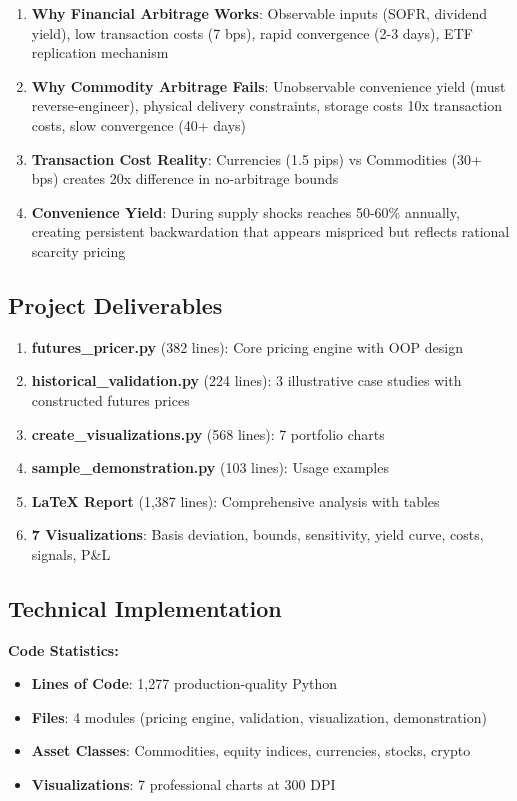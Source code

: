 \documentclass[12pt,a4paper]{article}
\begin{document}
\begin{enumerate}
    \item \textbf{Why Financial Arbitrage Works}: Observable inputs (SOFR, dividend yield), low transaction costs (7 bps), rapid convergence (2-3 days), ETF replication mechanism

    \item \textbf{Why Commodity Arbitrage Fails}: Unobservable convenience yield (must reverse-engineer), physical delivery constraints, storage costs 10x transaction costs, slow convergence (40+ days)

    \item \textbf{Transaction Cost Reality}: Currencies (1.5 pips) vs Commodities (30+ bps) creates 20x difference in no-arbitrage bounds

    \item \textbf{Convenience Yield}: During supply shocks reaches 50-60\% annually, creating persistent backwardation that appears mispriced but reflects rational scarcity pricing
\end{enumerate}

\subsection*{Project Deliverables}

\begin{enumerate}
    \item \textbf{futures\_pricer.py} (382 lines): Core pricing engine with OOP design
    \item \textbf{historical\_validation.py} (224 lines): 3 illustrative case studies with constructed futures prices
    \item \textbf{create\_visualizations.py} (568 lines): 7 portfolio charts
    \item \textbf{sample\_demonstration.py} (103 lines): Usage examples
    \item \textbf{LaTeX Report} (1,387 lines): Comprehensive analysis with tables
    \item \textbf{7 Visualizations}: Basis deviation, bounds, sensitivity, yield curve, costs, signals, P\&L
\end{enumerate}

\subsection*{Technical Implementation}

\textbf{Code Statistics:}
\begin{itemize}[leftmargin=*]
    \item \textbf{Lines of Code}: 1,277 production-quality Python
    \item \textbf{Files}: 4 modules (pricing engine, validation, visualization, demonstration)
    \item \textbf{Asset Classes}: Commodities, equity indices, currencies, stocks, crypto
    \item \textbf{Visualizations}: 7 professional charts at 300 DPI
\end{itemize}
\end{document}
